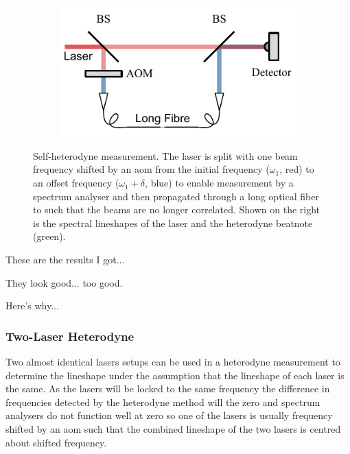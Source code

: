 \begin{figure}
    \begin{subfigure}{0.49\linewidth}
    \includegraphics{part1/Figs/SelfHeterodyne.pdf}
    \end{subfigure}
    \begin{subfigure}{0.49\linewidth}
    
    \end{subfigure}
    \caption{Self-heterodyne measurement. The laser is split with one beam frequency shifted by an \gls{aom} from the initial frequency ($\omega_1$, red) to an offset frequency ($\omega_1+\delta$, blue) to enable measurement by a spectrum analyser and then propagated through a long optical fiber to such that the beams are no longer correlated. Shown on the right is the spectral lineshapes of the laser and the heterodyne beatnote (green).}
    \label{figure:heterodyne_reference}
\end{figure}

These are the results I got...

They look good... too good.

Here's why...\cite{richter_linewidth_1986}

\subsubsection{Two-Laser Heterodyne}

Two almost identical lasers setups can be used in a heterodyne measurement to determine the lineshape under the assumption that the lineshape of each laser is the same.
As the lasers will be locked to the same frequency the difference in frequencies detected by the heterodyne method will the zero and spectrum analysers do not function well at zero so one of the lasers is usually frequency shifted by an \gls{aom} such that the combined lineshape of the two lasers is centred about shifted frequency.

